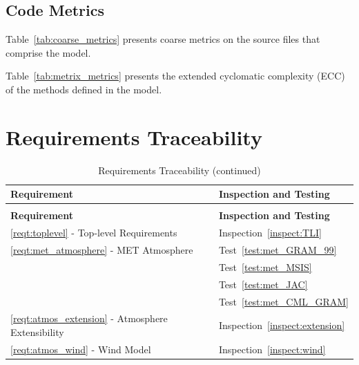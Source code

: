 \subsection{Code Metrics}

Table~\ref{tab:coarse_metrics} presents coarse metrics on the
source files that comprise the model.



Table~\ref{tab:metrix_metrics} presents the extended cyclomatic
complexity
(ECC) of the methods defined in the model.



\section{Requirements Traceability}\label{sec:traceability}

\begin{longtable}[c]{||p{3in}|p{3in}|}
\caption{Requirements Traceability} \\[6pt]
\hline
{\bf Requirement} & {\bf Inspection and Testing} \\
\hline \hline
\endfirsthead
\hline
\endfoot
\caption[]{Requirements Traceability (continued)} \\[6pt]
\hline
{\bf Requirement} & {\bf Inspection and Testing} \\
\hline \hline
\endhead

\ref{reqt:toplevel} - Top-level Requirements &
  Inspection~\ref{inspect:TLI} \\
  \hline

\ref{reqt:met_atmosphere} - MET Atmosphere &
   Test~\ref{test:met_GRAM_99} \\
   &Test~\ref{test:met_MSIS} \\
   &Test~\ref{test:met_JAC} \\
   &Test~\ref{test:met_CML_GRAM} \\

   \hline

 \ref{reqt:atmos_extension} - Atmosphere Extensibility &
   Inspection~\ref{inspect:extension} \\
 \hline

 \ref{reqt:atmos_wind} - Wind Model &
   Inspection~\ref{inspect:wind} \\

 \hline

\end{longtable}

